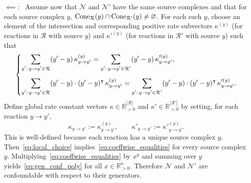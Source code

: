 \documentclass[10pt,a4paper]{amsart}
\let\emptyset\varnothing
\theoremstyle{definition}
\theoremstyle{remark}
\theoremstyle{consequence}
\def\cN{\mathcal{N}}
\def\cR{\mathcal{R}}
\numberwithin{equation}{section}
\begin{document}
{\medskip
 $\impliedby$:~
Assume now that $\cN$ and $\cN'$ have the same source complexes and that for each source complex $y$,
${\rm Cone}_{\cR}(y)\cap {\rm Cone}_{\cR'}(y)\neq \emptyset$.
For each such $y$, choose an element of the intersection and corresponding positive rate subvectors
$\kappa^{(y)}$ (for reactions in $\cR$ with source $y$) and $\kappa'^{(y)}$ (for reactions in $\cR'$ with source $y$) such that
\begin{equation}\label{eq:local_choice}
\begin{dcases}
\displaystyle
\sum_{\substack{y':\,y\to y'\in\cR}} (y'-y)\,\kappa^{(y)}_{y\to y'}
=
\sum_{\substack{y':\,y\to y'\in\cR'}} (y'-y)\,\kappa'^{(y)}_{y\to y'},\\[1.2ex]
\displaystyle
\sum_{\substack{y':\,y\to y'\in\cR}} (y'-y)\cdot(y'-y)^{\intercal}\,\kappa^{(y)}_{y\to y'}
=
\sum_{\substack{y':\,y\to y'\in\cR'}} (y'-y)\cdot(y'-y)^{\intercal}\,\kappa'^{(y)}_{y\to y'}.
\end{dcases}
\end{equation}
Define global rate constant vectors $\kappa\in\mathbb R^{|\cR|}_{>0}$ and $\kappa'\in\mathbb R^{|\cR'|}_{>0}$ by setting, for each reaction $y\to y'$,
\[
\kappa_{y\to y'} := \kappa^{(y)}_{y\to y'},
\qquad
\kappa'_{y\to y'} := \kappa'^{(y)}_{y\to y'}.
\]
This is well-defined because each reaction has a unique source complex $y$. Then~\eqref{eq:local_choice} implies~\eqref{eq:coeffwise_equalities} for every source complex $y$.
Multiplying~\eqref{eq:coeffwise_equalities} by $x^y$ and summing over $y$ yields~\eqref{eq:gen_conf_poly} for all $x\in\mathbb R^n_{>0}$.
Therefore $\cN$ and $\cN'$ are confoundable with respect to their generators.
}
\end{document}
